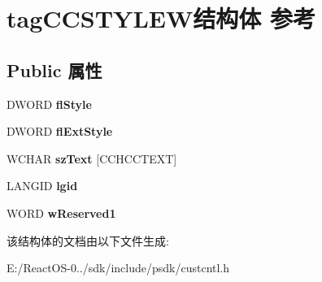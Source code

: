 \hypertarget{structtag_c_c_s_t_y_l_e_w}{}\section{tag\+C\+C\+S\+T\+Y\+L\+E\+W结构体 参考}
\label{structtag_c_c_s_t_y_l_e_w}
\subsection*{Public 属性}
\begin{DoxyCompactItemize}
\item 
\mbox{\label{structtag_c_c_s_t_y_l_e_w_aaec4cfbae31227b2c5046ec63b894b30}} 
D\+W\+O\+RD {\bfseries fl\+Style}
\item 
\mbox{\label{structtag_c_c_s_t_y_l_e_w_a6b3e089b66349c645337500c7a040d0a}} 
D\+W\+O\+RD {\bfseries fl\+Ext\+Style}
\item 
\mbox{\label{structtag_c_c_s_t_y_l_e_w_a37cd4285da4e7f3319e328a4c9f8ae01}} 
W\+C\+H\+AR {\bfseries sz\+Text} \mbox{[}C\+C\+H\+C\+C\+T\+E\+XT\mbox{]}
\item 
\mbox{\label{structtag_c_c_s_t_y_l_e_w_a3c68b332f7ea93616c67d667bfbe5608}} 
L\+A\+N\+G\+ID {\bfseries lgid}
\item 
\mbox{\label{structtag_c_c_s_t_y_l_e_w_a78a4b013004dd9a149fa56d5f3663f75}} 
W\+O\+RD {\bfseries w\+Reserved1}
\end{DoxyCompactItemize}


该结构体的文档由以下文件生成\+:\begin{DoxyCompactItemize}
\item 
E\+:/\+React\+O\+S-\/0../sdk/include/psdk/custcntl.\+h\end{DoxyCompactItemize}
